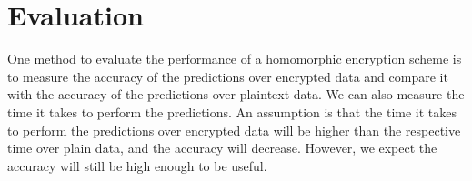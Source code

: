 \documentclass{article}
\begin{document}
\section*{Evaluation}
One method to evaluate the performance of a homomorphic encryption scheme is to measure the accuracy of the predictions over encrypted data and compare it with the accuracy of the predictions over plaintext data. We can also measure the time it takes to perform the predictions. An assumption is that the time it takes to perform the predictions over encrypted data will be higher than the respective time over plain data, and the accuracy will decrease. However, we expect the accuracy will still be high enough to be useful.







\end{document}
